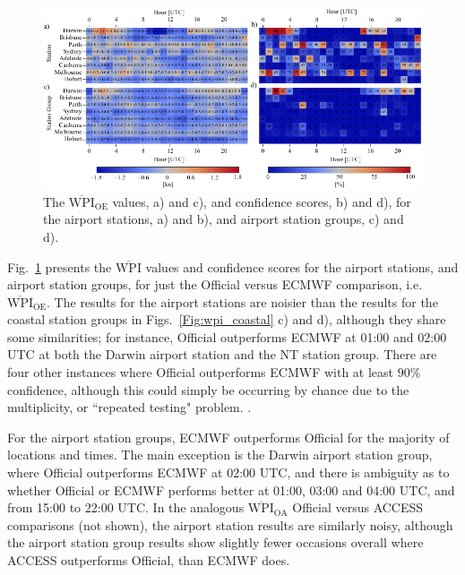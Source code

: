 \documentclass[twocol]{ametsoc}
\begin{document}
\begin{figure}
\centering
\includegraphics[width=39pc]{airport_wpi.pdf}
\caption{The $\overline{\text{WPI}}_\text{OE}$ values, a) and c), and confidence scores, b) and d), for the airport stations, a) and b), and airport station groups, c) and d).}
\label{Fig:airport_wpi}
\end{figure}

Fig.~\ref{Fig:airport_wpi} presents the $\overline{\text{WPI}}$ values and confidence scores for the airport stations, and airport station groups, for just the Official versus ECMWF comparison, i.e.~$\overline{\text{WPI}}_\text{OE}$. The results for the airport stations are noisier than the results for the coastal station groups in Figs.~\ref{Fig:wpi_coastal} c) and d), although they share some similarities; for instance, Official outperforms ECMWF at 01:00 and 02:00 UTC at both the Darwin airport station and the NT station group. There are four other instances where Official outperforms ECMWF with at least $90\%$ confidence, although this could simply be occurring by chance due to the multiplicity, or ``repeated testing" problem. \citep[p. 178]{wilks11}.

For the airport station groups, ECMWF outperforms Official for the majority of locations and times. The main exception is the Darwin airport station group, where Official outperforms ECMWF at 02:00 UTC, and there is ambiguity as to whether Official or ECMWF performs better at 01:00, 03:00 and 04:00 UTC, and from 15:00 to 22:00 UTC. In the analogous $\overline{\text{WPI}}_\text{OA}$ Official versus ACCESS comparisons (not shown), the airport station results are similarly noisy, although the airport station group results show slightly fewer occasions overall where ACCESS outperforms Official, than ECMWF does. 
\end{document}
